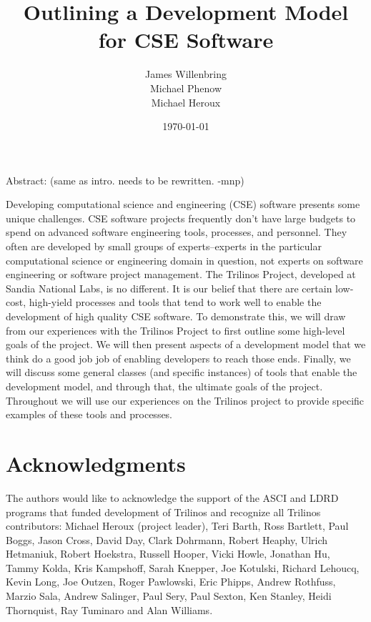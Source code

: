 \documentclass[12pt,relax]{article}
\title{Outlining a Development Model for CSE Software}
\author{
James Willenbring\\
Michael Phenow\\
Michael Heroux\\
}
\date{\today} %
\begin{document}
\maketitle



Abstract:  (same as intro. needs to be rewritten.  -mnp)

Developing computational science and engineering (CSE) software presents some 
unique challenges.  CSE software projects frequently don't have large budgets 
to spend on advanced software engineering tools, processes, and personnel.  
They often are developed by small groups of experts--experts in the particular 
computational science or engineering domain in question, not experts on 
software engineering or software project management.  The Trilinos Project,
developed at Sandia National Labs, is no different.  It is our belief that 
there are certain low-cost, high-yield processes and tools that tend to work 
well to enable the development of high quality CSE software.  To demonstrate 
this, we will draw from our experiences with the Trilinos Project to first
outline some high-level goals of the project.  We will then present aspects of
a development model that we think do a good job job of enabling developers to
reach those ends.  Finally, we will discuss some general classes (and specific
instances) of tools that enable the development model, and through that, 
the ultimate goals of the project.  Throughout we will use our experiences on 
the Trilinos project to provide specific examples of these tools and processes.


\clearpage


\section*{Acknowledgments}

The authors would like to acknowledge the support of the ASCI and LDRD programs 
that funded development of Trilinos and recognize all Trilinos contributors:
Michael Heroux (project leader), Teri Barth, Ross Bartlett, Paul Boggs, Jason
Cross, David Day, Clark Dohrmann, Robert Heaphy, Ulrich Hetmaniuk, Robert
Hoekstra, Russell Hooper, Vicki Howle, Jonathan Hu, Tammy Kolda, Kris
Kampshoff, Sarah Knepper, Joe Kotulski, Richard Lehoucq, Kevin Long, Joe
Outzen, Roger Pawlowski, Eric Phipps, Andrew Rothfuss, Marzio Sala, Andrew
Salinger, Paul Sery, Paul Sexton, Ken Stanley, Heidi Thornquist, Ray Tuminaro
and Alan Williams.
\end{document}
